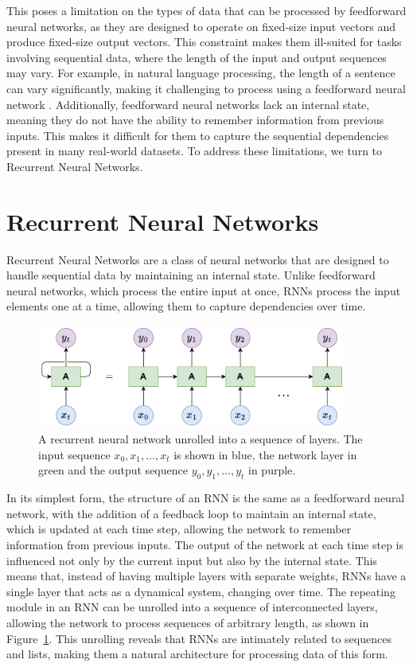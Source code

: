 \documentclass{article}
\newcommand{\reffig}[1]{Figure~\ref{#1}}
\begin{document}
This poses a limitation on the types of data that can be processed by feedforward neural
networks, as they are designed to operate on fixed-size input vectors and produce
fixed-size output vectors. This constraint makes them ill-suited for tasks involving
sequential data, where the length of the input and output sequences may vary. For example,
in natural language processing, the length of a sentence can vary significantly, making it
challenging to process using a feedforward neural network \cite{Sundermeyer2015}.
Additionally, feedforward neural networks lack an internal state, meaning they do not have
the ability to remember information from previous inputs. This makes it difficult for them
to capture the sequential dependencies present in many real-world datasets. To address
these limitations, we turn to Recurrent Neural Networks.



\section{Recurrent Neural Networks}
\label{ch:2}

Recurrent Neural Networks are a class of neural networks that are designed to
handle sequential data by maintaining an internal state. Unlike feedforward neural
networks, which process the entire input at once, RNNs process the input elements
one at a time, allowing them to capture dependencies over time.

\begin{figure}[htbp]
  \centering
  \includegraphics[width=0.9\textwidth]{RNN Unrolled.drawio.png}
  \caption{A recurrent neural network unrolled into a sequence of layers. The input
    sequence $x_0, x_1, \ldots, x_t$ is shown in blue, the network layer in green and the
    output sequence $y_0, y_1, \ldots, y_t$ in purple.}
  \label{fig:rnn-unrolled}
\end{figure}

In its simplest form, the structure of an RNN is the same as a feedforward neural network,
with the addition of a feedback loop to maintain an internal state, which is updated at
each time step, allowing the network to remember information from previous inputs. The
output of the network at each time step is influenced not only by the current input but
also by the internal state. This means that, instead of having multiple layers with
separate weights, RNNs have a single layer that acts as a dynamical system, changing over
time. The repeating module in an RNN can be unrolled into a sequence of interconnected
layers, allowing the network to process sequences of arbitrary length, as shown in
\reffig{fig:rnn-unrolled}. This unrolling reveals that RNNs are intimately related to
sequences and lists, making them a natural architecture for processing data of this form.
\end{document}
